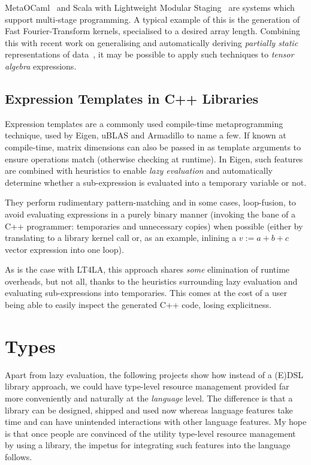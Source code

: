 MetaOCaml~\cite{metaocaml} and Scala with Lightweight Modular
Staging~\cite{scala_lms} are systems which support multi-stage programming. A
typical example of this is the generation of Fast Fourier-Transform kernels,
specialised to a desired array length. Combining this with recent work on
generalising and automatically deriving \emph{partially static} representations
of data~\cite{yallop}, it may be possible to apply such techniques to
\emph{tensor algebra} expressions.

\subsection{Expression Templates in C++ Libraries}

Expression templates are a commonly used compile-time metaprogramming
technique, used by Eigen, uBLAS and Armadillo to name a few. If known at
compile-time, matrix dimensions can also be passed in as template arguments to
ensure operations match (otherwise checking at runtime). In Eigen, such
features are combined with heuristics to enable \emph{lazy evaluation} and
automatically determine whether a sub-expression is evaluated into a temporary
variable or not.

They perform rudimentary pattern-matching and in some cases, loop-fusion, to
avoid evaluating expressions in a purely binary manner (invoking the bane of a
C++ programmer: temporaries and unnecessary copies) when possible (either by
translating to a library kernel call or, as an example, inlining a $v := a + b
+ c$ vector expression into one loop).

As is the case with LT4LA, this approach shares \emph{some} elimination of
runtime overheads, but not all, thanks to the heuristics surrounding lazy
evaluation and evaluating sub-expressions into temporaries. This comes at the
cost of a user being able to easily inspect the generated C++ code, losing
explicitness.

\section{Types}

Apart from lazy evaluation, the following projects show how instead of a (E)DSL
library approach, we could have type-level resource management provided far
more conveniently and naturally at the \emph{language} level. The difference is
that a library can be designed, shipped and used now whereas language features
take time and can have unintended interactions with other language features. My
hope is that once people are convinced of the utility type-level resource
management by using a library, the impetus for integrating such features into
the language follows.

